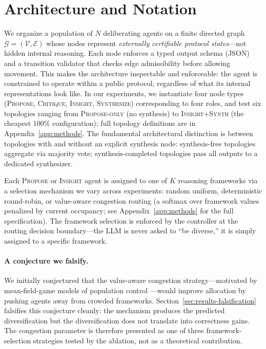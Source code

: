 \documentclass[11pt]{amsart}
\newcommand\1{{\mathds{1}}}
\newcommand\V{{\mathcal{V}}}
\newcommand\G{{\mathcal{G}}}
\theoremstyle{definition}
\theoremstyle{remark}
\numberwithin{equation}{section}
\begin{document}
\section{Architecture and Notation}\label{sec:arch}

We organize a population of $N$ deliberating agents on a finite directed graph $\G = (\V, \mathcal{E})$ whose nodes represent \emph{externally certifiable protocol states}---not hidden internal reasoning.
Each node enforces a typed output schema (JSON) and a transition validator that checks edge admissibility before allowing movement.
This makes the architecture inspectable and enforceable: the agent is constrained to operate within a public protocol, regardless of what its internal representations look like.
In our experiments, we instantiate four node types (\textsc{Propose}, \textsc{Critique}, \textsc{Insight}, \textsc{Synthesize}) corresponding to four roles, and test six topologies ranging from \textsc{Propose-only} (no synthesis) to \textsc{Insight+Synth} (the cheapest $100\%$ configuration); full topology definitions are in Appendix~\ref{app:methods}.
The fundamental architectural distinction is between topologies with and without an explicit synthesis node: synthesis-free topologies aggregate via majority vote; synthesis-completed topologies pass all outputs to a dedicated synthesizer.

Each \textsc{Propose} or \textsc{Insight} agent is assigned to one of $K$ reasoning frameworks via a selection mechanism we vary across experiments: random uniform, deterministic round-robin, or value-aware congestion routing (a softmax over framework values penalized by current occupancy; see Appendix~\ref{app:methods} for the full specification).
The framework selection is enforced by the controller at the routing decision boundary---the LLM is never asked to ``be diverse,'' it is simply assigned to a specific framework.

\paragraph{A conjecture we falsify.}
We initially conjectured that the value-aware congestion strategy---motivated by mean-field-game models of population control \cite{LasryLions2007, HuangMalhameCaines2006, Gomes2010, Gueant2015}---would improve allocation by pushing agents away from crowded frameworks.
Section~\ref{sec:results-falsification} falsifies this conjecture cleanly: the mechanism produces the predicted diversification but the diversification does not translate into correctness gains.
The congestion parameter is therefore presented as one of three framework-selection strategies tested by the ablation, not as a theoretical contribution.
\end{document}
